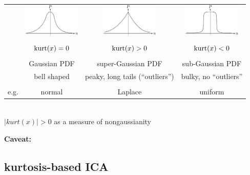 \begin{frame}

\\

\begin{tabular}[h]{c c c c}
&
\includegraphics[width=2.7cm]{img/section2_fig20} &
\includegraphics[width=2.7cm]{img/section2_fig21} & 
\includegraphics[width=2.7cm]{img/section2_fig22} \\ \\

& $\operatorname{kurt}(x) = 0$ & $\operatorname{kurt}(x) > 0$ & $\operatorname{kurt}(x) < 0$\\ \\

&
Gaussian PDF &
super-Gaussian PDF&
sub-Gaussian PDF\\
&bell shaped & peaky, long tails (``outliers'')& bulky, no ``outliers'' \\\\
e.g.&normal & Laplace & uniform
\end{tabular}\\[1cm]

$|kurt(x)| > 0$ as a measure of nongaussianity 

\textbf{Caveat:}
\end{frame}



\newpage

\subsection{kurtosis-based ICA}

